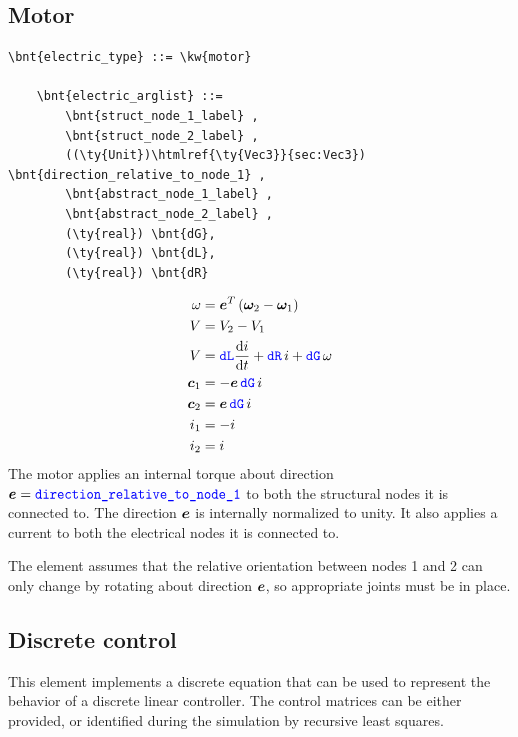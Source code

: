 \subsection{Motor}
\begin{Verbatim}[commandchars=\\\{\}]
    \bnt{electric_type} ::= \kw{motor}

    \bnt{electric_arglist} ::=
        \bnt{struct_node_1_label} ,
        \bnt{struct_node_2_label} ,
        ((\ty{Unit})\htmlref{\ty{Vec3}}{sec:Vec3}) \bnt{direction_relative_to_node_1} ,
        \bnt{abstract_node_1_label} ,
        \bnt{abstract_node_2_label} ,
        (\ty{real}) \bnt{dG},
        (\ty{real}) \bnt{dL},
        (\ty{real}) \bnt{dR}
\end{Verbatim}
\begin{subequations}
\begin{align}
	\omega &= \boldsymbol{e}^T \left( \boldsymbol{\omega}_2 - \boldsymbol{\omega}_1 \right) \\
	V &= V_2 - V_1 \\
	V &= \textcolor{blue}{\texttt{dL}} \frac{\mathrm{d}i}{\mathrm{d}t} + \textcolor{blue}{\texttt{dR}} \, i + \textcolor{blue}{\texttt{dG}} \, \omega \\
	\boldsymbol{c}_1 &= - \boldsymbol{e} \, \textcolor{blue}{\texttt{dG}} \, i \\
	\boldsymbol{c}_2 &= \boldsymbol{e} \, \textcolor{blue}{\texttt{dG}} \, i \\
	i_1 &= -i \\
	i_2 &= i
\end{align}
\end{subequations}
The motor applies an internal torque about direction
$\boldsymbol{e}=\textcolor{blue}{\texttt{direction\_relative\_to\_node\_1}}$
to both the structural nodes it is connected to.
The direction $\boldsymbol{e}$ is internally normalized to unity.
It also applies a current to both the electrical nodes it is connected to.

The element assumes that the relative orientation between nodes 1 and 2
can only change by rotating about direction $\boldsymbol{e}$, so appropriate
joints must be in place.


\subsection{Discrete control}\label{sec:EL:DISCCTRL}
This element implements a discrete equation
that can be used to represent the behavior
of a discrete linear controller.
The control matrices can be either provided,
or identified during the simulation by recursive least squares.

